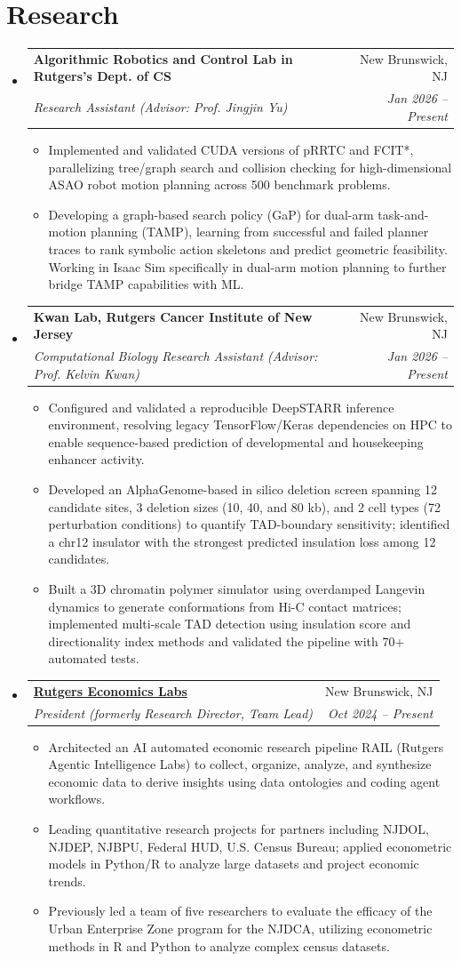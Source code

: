 \documentclass[letterpaper,11pt]{article}
\makeatletter
\newcommand{\resumeItem}[1]{
  \item\small{
    {#1 \vspace{-2pt}}
  }
}
\newcommand{\resumeSubheading}[4]{
  \vspace{-2pt}\item
    \begin{tabular*}{0.97\textwidth}[t]{l@{\extracolsep{\fill}}r}
      \textbf{#1} & #2 \\
      \textit{\small#3} & \textit{\small #4} \\
    \end{tabular*}\vspace{-7pt}
}
\newcommand{\resumeSubHeadingListStart}{\begin{itemize}[leftmargin=0.15in, label={}]}
\newcommand{\resumeSubHeadingListEnd}{\end{itemize}}
\newcommand{\resumeItemListStart}{\begin{itemize}}
\newcommand{\resumeItemListEnd}{\end{itemize}\vspace{-5pt}}
\makeatother
\begin{document}
\section{Research}
  \resumeSubHeadingListStart
    \resumeSubheading
      {Algorithmic Robotics and Control Lab in Rutgers's Dept. of CS}{New Brunswick, NJ}
      {Research Assistant (Advisor: Prof. Jingjin Yu)}{Jan 2026 -- Present}
      \resumeItemListStart
        \resumeItem{Implemented and validated CUDA versions of pRRTC and FCIT*, parallelizing tree/graph search and collision checking for high-dimensional ASAO robot motion planning across 500 benchmark problems.}
        \resumeItem{Developing a graph-based search policy (GaP) for dual-arm task-and-motion planning (TAMP), learning from successful and failed planner traces to rank symbolic action skeletons and predict geometric feasibility. Working in Isaac Sim specifically in dual-arm motion planning to further bridge TAMP capabilities with ML.}
      \resumeItemListEnd
    \resumeSubheading
        {Kwan Lab, Rutgers Cancer Institute of New Jersey}{New Brunswick, NJ}
        {Computational Biology Research Assistant (Advisor: Prof. Kelvin Kwan)}{Jan 2026 -- Present}
        \resumeItemListStart
            \resumeItem{Configured and validated a reproducible DeepSTARR inference environment, resolving legacy TensorFlow/Keras dependencies on HPC to enable sequence-based prediction of developmental and housekeeping enhancer activity.}
            \resumeItem{Developed an AlphaGenome-based in silico deletion screen spanning 12 candidate sites, 3 deletion sizes (10, 40, and 80 kb), and 2 cell types (72 perturbation conditions) to quantify TAD-boundary sensitivity; identified a chr12 insulator with the strongest predicted insulation loss among 12 candidates.}
            \resumeItem{Built a 3D chromatin polymer simulator using overdamped Langevin dynamics to generate conformations from Hi-C contact matrices; implemented multi-scale TAD detection using insulation score and directionality index methods and validated the pipeline with 70+ automated tests.}
    \resumeItemListEnd
  \resumeSubheading
      {\href{https://rutgerseconomics.org}{Rutgers Economics Labs}}{New Brunswick, NJ}
      {President (formerly Research Director, Team Lead)}{Oct 2024 -- Present}
      \resumeItemListStart
        \resumeItem{Architected an AI automated economic research pipeline RAIL (Rutgers Agentic Intelligence Labs) to collect, organize, analyze, and synthesize economic data to derive insights using data ontologies and coding agent workflows.}
        \resumeItem{Leading quantitative research projects for partners including NJDOL, NJDEP, NJBPU, Federal HUD, U.S. Census Bureau; applied econometric models in Python/R to analyze large datasets and project economic trends.}
        \resumeItem{Previously led a team of five researchers to evaluate the efficacy of the Urban Enterprise Zone program for the NJDCA, utilizing econometric methods in R and Python to analyze complex census datasets.}
      \resumeItemListEnd
  \resumeSubHeadingListEnd
\end{document}
